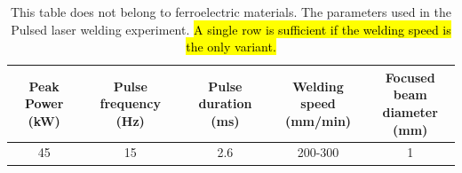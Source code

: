 \documentclass[a4paper,fleqn]{cas-sc}
\begin{document}
\begin{table}[h]  
    \caption{\label{welding-parameter}  This table does not belong to ferroelectric materials. The parameters used in the Pulsed laser welding experiment. \hl{A single row is sufficient if the welding speed is the only variant.}}
    \centering
 \begin{tabular*}{13cm}{ccccc} 
   \toprule  
    \makecell{Peak Power \\(kW)}&\makecell{Pulse frequency\\ (Hz)}& \makecell{Pulse duration\\ (ms)} & \makecell{Welding speed\\ (mm/min)}  &    \makecell{Focused beam\\ diameter\\ (mm) }       \\   
    \midrule  
   45   &  15   &  2.6  &  200-300  &  1  \\
    \bottomrule 
    \end{tabular*}
    \end{table}
\end{document}
